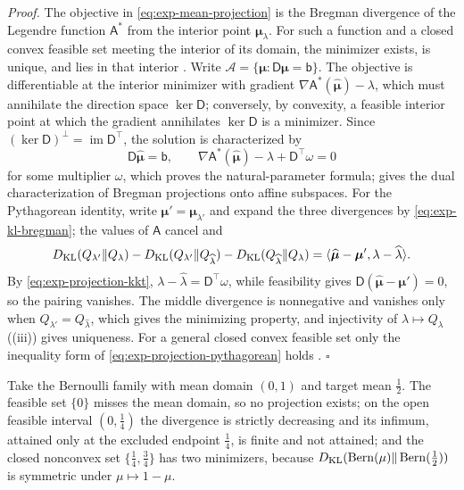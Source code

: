 \noindent\emph{Proof.}
The objective in \eqref{eq:exp-mean-projection} is the Bregman divergence of
the Legendre function \(\mathsf A^\ast\) from the interior point
\(\boldsymbol\mu_\lambda\). For such a function and a closed convex feasible
set meeting the interior of its domain, the minimizer exists, is unique, and
lies in that interior \citep[Theorem~3.12(iii)]{BauschkeBorwein1997}. Write
\(\mathscr A=\{\boldsymbol\mu:\mathsf D\boldsymbol\mu=\mathsf b\}\). The
objective is differentiable at the interior minimizer with gradient
\(\nabla\mathsf A^\ast(\widehat{\boldsymbol\mu})-\lambda\), which must
annihilate the direction space \(\ker\mathsf D\); conversely, by convexity, a
feasible interior point at which the gradient annihilates \(\ker\mathsf D\) is
a minimizer. Since \((\ker\mathsf D)^\perp=\operatorname{im}\mathsf D^\top\),
the solution is characterized by
\begin{equation}
\mathsf D\widehat{\boldsymbol\mu}=\mathsf b,\qquad
\nabla\mathsf A^\ast(\widehat{\boldsymbol\mu})-\lambda+\mathsf D^\top\omega=0
\label{eq:exp-projection-kkt}
\end{equation}
for some multiplier \(\omega\), which proves the natural-parameter formula;
\citet{Bauschke2003} gives the dual characterization of Bregman projections
onto affine subspaces. For the Pythagorean identity, write
\(\boldsymbol\mu'=\boldsymbol\mu_{\lambda'}\) and expand the three divergences
by \eqref{eq:exp-kl-bregman}; the values of \(\mathsf A\) cancel and
\[
D_{\mathrm{KL}}(Q_{\lambda'}\Vert Q_\lambda)
-D_{\mathrm{KL}}(Q_{\lambda'}\Vert Q_{\widehat\lambda})
-D_{\mathrm{KL}}(Q_{\widehat\lambda}\Vert Q_\lambda)
=\langle\widehat{\boldsymbol\mu}-\boldsymbol\mu',\lambda-\widehat\lambda\rangle.
\]
By \eqref{eq:exp-projection-kkt}, \(\lambda-\widehat\lambda=\mathsf D^\top\omega\),
while feasibility gives \(\mathsf D(\widehat{\boldsymbol\mu}-\boldsymbol\mu')=0\),
so the pairing vanishes. The middle divergence is nonnegative and vanishes
only when \(Q_{\lambda'}=Q_{\widehat\lambda}\), which gives the minimizing
property, and injectivity of \(\lambda\mapsto Q_\lambda\)
((iii)) gives uniqueness. For a general
closed convex feasible set only the inequality form of
\eqref{eq:exp-projection-pythagorean} holds
\citep[Proposition~3.16]{BauschkeBorwein1997}. \(\square\)

Take the Bernoulli family with mean domain \((0,1)\) and target mean
\(\tfrac12\). The feasible set \(\{0\}\) misses the mean domain, so no
projection exists; on the open feasible interval \((0,\tfrac14)\) the
divergence is strictly decreasing and its infimum, attained only at the
excluded endpoint \(\tfrac14\), is finite and not attained; and the closed
nonconvex set \(\{\tfrac14,\tfrac34\}\) has two minimizers, because
\(D_{\mathrm{KL}}(\operatorname{Bern}(\mu)\Vert\operatorname{Bern}(\tfrac12))\) is
symmetric under \(\mu\mapsto1-\mu\). 


